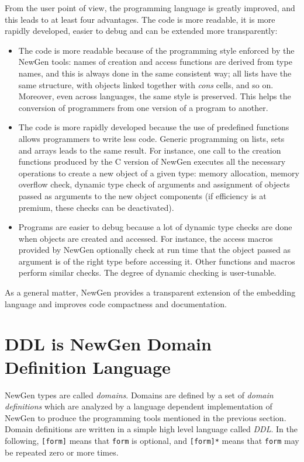 From the user point of view, the programming language is greatly
improved, and this leads to at least four advantages. The code is more
readable, it is more rapidly developed, easier to debug and can be
extended more transparently:
\begin{itemize}
\item
	The code is more readable because of the programming style
enforced by the NewGen tools: names of creation and access functions are
derived from type names, and this is always done in the same consistent
way; all lists have the same structure, with objects linked together
with {\em cons} cells, and so on. Moreover, even across languages, the
same style is preserved.  This helps the conversion of programmers from
one version of a program to another.
\item
	The code is more rapidly developed because the use of
predefined functions allows programmers to write less code. Generic
programming on lists, sets and arrays leads to the same result. For
instance, one call to the creation functions produced by the C version
of NewGen executes all the necessary operations to create a new object
of a given type: memory allocation, memory overflow check, dynamic type
check of arguments and assignment of objects passed as arguments to the
new object components (if efficiency is at premium, these checks can be
deactivated).
\item
	Programs are easier to debug because a lot of dynamic type
checks are done when objects are created and accessed. For instance, the
access macros provided by NewGen optionally check at run time that the
object passed as argument is of the right type before accessing it.
Other functions and macros perform similar checks. The degree of dynamic
checking is user-tunable.
\end{itemize}

As a general matter, NewGen provides a transparent extension of
the embedding language and improves code compactness and documentation.

\section{DDL is NewGen Domain Definition Language}

NewGen types are called {\em domains}. Domains are defined by a set of
{\em domain definitions} which are analyzed by a language dependent
implementation of NewGen to produce the programming tools mentioned in
the previous section. Domain definitions are written in a simple high
level language called {\em DDL}.  In the following, {\tt [form]} means
that {\tt form} is optional, and {\tt [form]*} means that {\tt form}
may be repeated zero or more times.

